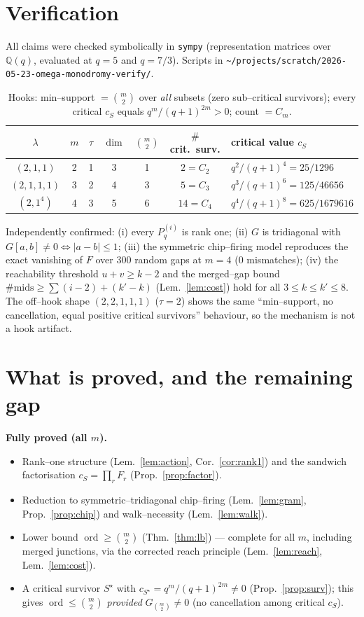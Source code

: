 \documentclass[11pt]{article}
\theoremstyle{definition}
\DeclareMathOperator{\ord}{ord}
\newcommand{\Pq}{P_{q}}
\newcommand{\la}{\lambda}
\begin{document}
\section{Verification}\label{sec:verif}

All claims were checked symbolically in \texttt{sympy} (representation matrices over
$\mathbb Q(q)$, evaluated at $q=5$ and $q=7/3$). Scripts in
\texttt{\~{}/projects/scratch/2026-05-23-omega-monodromy-verify/}.

\begin{table}[h]\centering
\begin{tabular}{c|c|c|c|c|c|l}
$\la$ & $m$ & $\tau$ & $\dim$ & $\binom m2$ & $\#$crit.\ surv. & critical value $c_S$\\\hline
$(2,1,1)$   & 2 & 1 & 3 & 1 & $2=C_2$  & $q^2/(q+1)^4=25/1296$\\
$(2,1,1,1)$ & 3 & 2 & 4 & 3 & $5=C_3$  & $q^3/(q+1)^6=125/46656$\\
$(2,1^4)$   & 4 & 3 & 5 & 6 & $14=C_4$ & $q^4/(q+1)^8=625/1679616$\\
\end{tabular}
\caption{Hooks: min--support $=\binom m2$ over \emph{all} subsets (zero sub--critical
survivors); every critical $c_S$ equals $q^m/(q+1)^{2m}>0$; count $=C_m$.}
\label{tab:verif}
\end{table}

\noindent Independently confirmed: (i) every $\Pq^{(i)}$ is rank one; (ii) $G$ is
tridiagonal with $G[a,b]\ne0\iff|a-b|\le1$; (iii) the symmetric chip--firing model
reproduces the exact vanishing of $F$ over $300$ random gaps at $m=4$ ($0$
mismatches); (iv) the reachability threshold $u+v\ge k-2$ and the merged--gap bound
$\#\text{mids}\ge\sum(i-2)+(k'-k)$ (Lem.~\ref{lem:cost}) hold for all
$3\le k\le k'\le8$. The off--hook shape
$(2,2,1,1,1)$ ($\tau=2$) shows the same ``min--support, no cancellation, equal positive
critical survivors'' behaviour, so the mechanism is not a hook artifact.

\section{What is proved, and the remaining gap}\label{sec:gaps}

\textbf{Fully proved (all $m$).}
\begin{itemize}
\item Rank--one structure (Lem.~\ref{lem:action}, Cor.~\ref{cor:rank1}) and the
sandwich factorisation $c_S=\prod_r F_r$ (Prop.~\ref{prop:factor}).
\item Reduction to symmetric--tridiagonal chip--firing (Lem.~\ref{lem:gram},
Prop.~\ref{prop:chip}) and walk--necessity (Lem.~\ref{lem:walk}).
\item Lower bound $\ord\ge\binom m2$ (Thm.~\ref{thm:lb}) --- complete for all $m$,
including merged junctions, via the corrected reach principle (Lem.~\ref{lem:reach},
Lem.~\ref{lem:cost}).
\item A critical survivor $S^\star$ with $c_{S^\star}=q^m/(q+1)^{2m}\ne0$
(Prop.~\ref{prop:surv}); this gives $\ord\le\binom m2$ \emph{provided}
$G_{\binom m2}\ne0$ (no cancellation among critical $c_S$).
\end{itemize}
\end{document}
